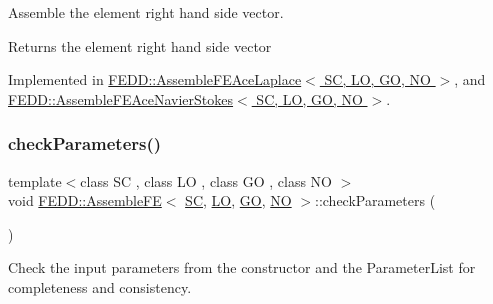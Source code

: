 Assemble the element right hand side vector. 

\begin{DoxyReturn}{Returns}
the element right hand side vector 
\end{DoxyReturn}


Implemented in \hyperlink{classFEDD_1_1AssembleFEAceLaplace_a6d2759738ff7b596b4f132bf234c772a}{F\+E\+D\+D\+::\+Assemble\+F\+E\+Ace\+Laplace$<$ S\+C, L\+O, G\+O, N\+O $>$}, and \hyperlink{classFEDD_1_1AssembleFEAceNavierStokes_af42c6437fdac694ffbdccd12f8c581f2}{F\+E\+D\+D\+::\+Assemble\+F\+E\+Ace\+Navier\+Stokes$<$ S\+C, L\+O, G\+O, N\+O $>$}.

\mbox{\label{classFEDD_1_1AssembleFE_a9d471f89532703a619e8a1545cab4602}} 
\subsubsection{\texorpdfstring{check\+Parameters()}{checkParameters()}}
{\footnotesize\ttfamily template$<$class SC , class LO , class GO , class NO $>$ \\
void \hyperlink{classFEDD_1_1AssembleFE}{F\+E\+D\+D\+::\+Assemble\+FE}$<$ \hyperlink{fe__test__laplace_8cpp_a79c7e86a57edbb2a5a53242bcd04e41e}{SC}, \hyperlink{fe__test__laplace_8cpp_ad6a38c9f07d3fd633eefca5bccad8410}{LO}, \hyperlink{fe__test__laplace_8cpp_afa2946b509009b4f45eb04bd8c5b27d9}{GO}, \hyperlink{fe__test__laplace_8cpp_a5e24f37b28787429872b6ecb1d0417ce}{NO} $>$\+::check\+Parameters (\begin{DoxyParamCaption}{ }\end{DoxyParamCaption})\hspace{0.3cm}{\ttfamily [virtual]}}



Check the input parameters from the constructor and the Parameter\+List for completeness and consistency. 

\mbox{\label{classFEDD_1_1AssembleFE_a35ada89164c74b433340733c01f30f4b}} 
